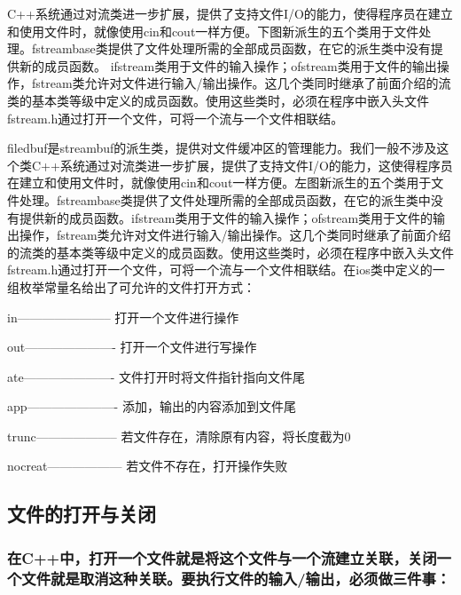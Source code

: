 \documentclass{article}
\begin{document}
C++系统通过对流类进一步扩展，提供了支持文件I/O的能力，使得程序员在建立和使用文件时，就像使用cin和cout一样方便。下图新派生的五个类用于文件处理。fstreambase类提供了文件处理所需的全部成员函数，在它的派生类中没有提供新的成员函数。 ifstream类用于文件的输入操作；ofstream类用于文件的输出操作，fstream类允许对文件进行输入/输出操作。这几个类同时继承了前面介绍的流类的基本类等级中定义的成员函数。使用这些类时，必须在程序中嵌入头文件fstream.h通过打开一个文件，可将一个流与一个文件相联结。

filedbuf是streambuf的派生类，提供对文件缓冲区的管理能力。我们一般不涉及这个类C++系统通过对流类进一步扩展，提供了支持文件I/O的能力，这使得程序员在建立和使用文件时，就像使用cin和cout一样方便。左图新派生的五个类用于文件处理。fstreambase类提供了文件处理所需的全部成员函数，在它的派生类中没有提供新的成员函数。ifstream类用于文件的输入操作；ofstream类用于文件的输出操作，fstream类允许对文件进行输入/输出操作。这几个类同时继承了前面介绍的流类的基本类等级中定义的成员函数。使用这些类时，必须在程序中嵌入头文件fstream.h通过打开一个文件，可将一个流与一个文件相联结。在ios类中定义的一组枚举常量名给出了可允许的文件打开方式：

in----------------------- 打开一个文件进行操作 

out---------------------- 打开一个文件进行写操作 

ate---------------------- 文件打开时将文件指针指向文件尾 

app---------------------- 添加，输出的内容添加到文件尾 

trunc-------------------- 若文件存在，清除原有内容，将长度截为0 

nocreat------------------ 若文件不存在，打开操作失败 
\subsection{文件的打开与关闭}
\label{sec-10-6}

\subsubsection{在C++中，打开一个文件就是将这个文件与一个流建立关联，关闭一个文件就是取消这种关联。要执行文件的输入/输出，必须做三件事：}
\label{sec-10-6-1}
\end{document}
